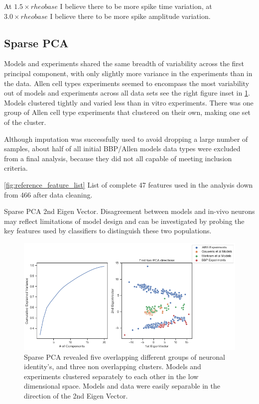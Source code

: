 At $1.5 \times rheobase $ I believe there to be more spike time variation, at $3.0 \times rheobase $  I believe there to be more spike amplitude variation.

\subsection{Sparse PCA}


Models and experiments shared the same breadth of variability across the first principal component, with only slightly more variance in the experiments than in the data. Allen cell types experiments seemed to encompass the most variability out of models and experiments across all data sets see the right figure inset in \ref{fig:pca_data_points}. Models clustered tightly and varied less than in vitro experiments. There was one group of Allen cell type experiments that clustered on their own, making one set of the cluster.


Although imputation was successfully used to avoid dropping a large number of samples, about half of all initial BBP/Allen models data types were excluded from a final analysis, because they did not all capable of meeting inclusion criteria.  

\ref{fig:reference_feature_list}
List of complete 47 features used in the analysis down from 466 after data cleaning.

Sparse PCA 2nd Eigen Vector. 
Disagreement between models and in-vivo neurons may reflect limitations of model design and can be investigated by probing the key features used by classifiers to distinguish these two populations. 

\begin{figure}    
\begin{center} \includegraphics[width=1.0\linewidth]{figures/cortical_model_data_agreement_52_1}
    \caption[Is this visible]{}
    \label{fig:}
\end{center}
\caption[Sparse PCA, variance explained, 1st and 2nd Principal Components]{Sparse PCA revealed five overlapping different groups of neuronal identity's, and three non overlapping clusters. Models and experiments clustered separately to each other in the low dimensional space. Models and data were easily separable in the direction of the 2nd Eigen Vector.}
\label{fig:pca_data_points}
\end{figure}    




